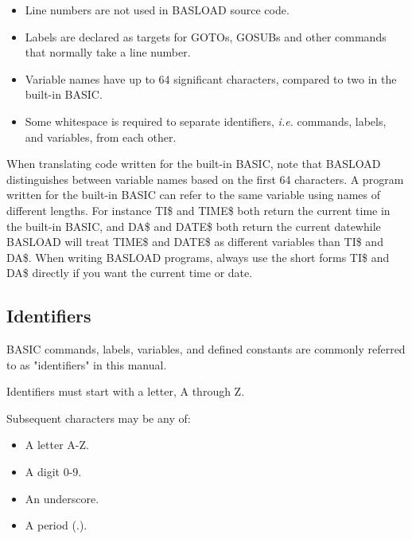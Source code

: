\documentclass{article}
\begin{document}
        \begin{itemize}
            \item Line numbers are not used in BASLOAD source code.
            \item Labels are declared as targets for GOTOs, GOSUBs and
                  other commands that normally take a line number.
            \item Variable names have up to 64 significant characters, compared to two
                  in the built-in BASIC.
            \item Some whitespace is required to separate identifiers, 
                  \textit{i.e.} commands, labels, and variables, from each other.
                  
        \end{itemize}

        When translating code written for the built-in BASIC, note that BASLOAD distinguishes between 
        variable names based on the first 64 characters. A program written for the built-in BASIC can refer 
        to the same variable using names of different lengths. For instance TI\$ and TIME\$ both return the 
        current time in the built-in BASIC, and DA\$ and DATE\$ both return the current date{\textemdash}while BASLOAD 
        will treat TIME\$ and DATE\$ as different variables than TI\$ and DA\$. When writing BASLOAD programs, 
        always use the short forms TI\$ and DA\$ directly if you want the current time or date.

    \subsection{Identifiers}

        BASIC commands, labels, variables, and defined constants are commonly referred to as "identifiers" in this
        manual.

        Identifiers must start with a letter, A through Z.

        Subsequent characters may be any of:

        \begin{itemize}
            \item A letter A-Z.
            \item A digit 0-9. 
            \item An underscore. 
            \item A period (.).
        \end{itemize}
\end{document}
